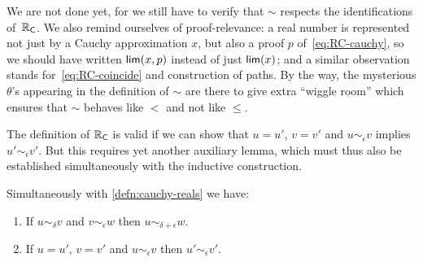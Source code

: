 We are not done yet, for we still have to verify that $\sim$ respects the identifications
of~$\mathbb{R}_\mathsf{C}$. We also remind ourselves of proof-relevance: a real number is represented not
just by a Cauchy approximation $x$, but also a proof $p$ of~\eqref{eq:RC-cauchy}, so we
should have written $\mathsf{lim}(x,p)$ instead of just $\mathsf{lim}(x)$; and a similar observation
stands for~\eqref{eq:RC-coincide} and construction of paths. By the way, the mysterious
$\theta$'s appearing in the definition of $\sim$ are there to give extra ``wiggle room''
which ensures that $\sim$ behaves like $<$ and not like $\leq$.

The definition of $\mathbb{R}_\mathsf{C}$ is valid if we can show that $u = u'$, $v = v'$ and $u
\sim_\epsilon v$ implies $u' \sim_\epsilon v'$. But this requires yet another auxiliary
lemma, which must thus also be established simultaneously with the inductive construction.

\begin{lem}\label{lem:RC-well-defined}
  Simultaneously with \autoref{defn:cauchy-reals} we have:
  \begin{enumerate}
  \item If $u \sim_\delta v$ and $v \sim_\epsilon w$ then $u \sim_{\delta + \epsilon} w$.
  \item If $u = u'$, $v = v'$ and $u \sim_\epsilon v$ then $u' \sim_\epsilon v'$.
  \end{enumerate}
\end{lem}

